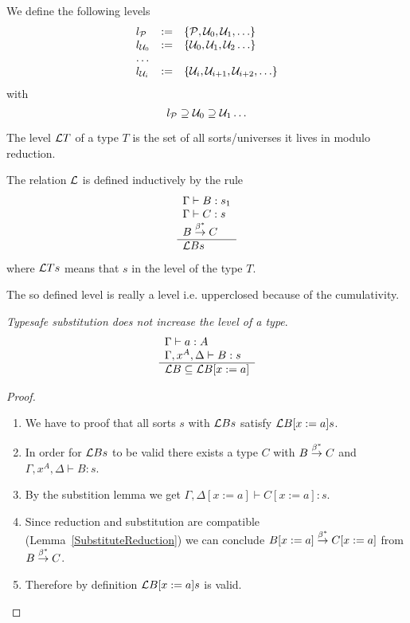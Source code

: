 We define the following levels
$$
\begin{array}{lll}
    l_{\cal P} &:=& \{{\cal P}, {\cal U}_0, {\cal U}_1, \ldots\}
    \\
    l_{{\cal U}_0} &:=& \{ {\cal U}_0, {\cal U}_1, {\cal U}_2 \ldots \}
    \\
    \ldots
    \\
    l_{{\cal U}_i} &:=& \{ {\cal U}_i, {\cal U}_{i+1}, {\cal U}_{i+2}, \ldots \}
\end{array}
$$
with
$$
    l_{\cal P} \supseteq {\cal U}_0 \supseteq {\cal U}_1 \ldots
$$


\begin{definition}
    The level ${\cal L} T$ of a type $T$ is the set of all sorts/universes it
    lives in modulo reduction.

    The relation ${\cal L}$ is defined inductively by the rule
    $$
    \begin{array}{l} 
        \Gamma \vdash B: s_1
        \\
        \Gamma \vdash C: s
        \\
        B \stackrel{\beta^*}{\to} C
     \\ \hline {\cal L} B s\end{array}
    $$
    where ${\cal L} T s$ means that $s$ in the level of the type $T$.
\end{definition}

The so defined level is really a level i.e. upperclosed because of the
cumulativity.


\begin{theorem}
    \emph{Typesafe substitution does not increase the level of a type}.
    $$
    \begin{array}{l} 
        \Gamma \vdash a: A
        \\
        \Gamma, x^A, \Delta \vdash B: s
     \\ \hline {\cal L} B \subseteq {\cal L} B[x:=a]\end{array}
    $$


    \begin{proof}
    \begin{enumerate}
        \item We have to proof that all sorts $s$ with ${\cal L} B s$ satisfy
        ${\cal L} B[x:=a] s$.

        \item In order for ${\cal L} B s$ to be valid there exists a type $C$ with $B
        \stackrel{\beta^*}{\to} C$ and $\Gamma, x^A, \Delta \vdash B: s$.

        \item By the substition lemma we get $\Gamma, \Delta[x:=a] \vdash C[x:=a]: s$.

        \item Since reduction and substitution are compatible
            (Lemma~\ref{SubstituteReduction})
            we can conclude $B[x:=a]
        \stackrel{\beta^*}{\to} C[x:=a]$  from $B \stackrel{\beta^*}{\to} C$.

        \item Therefore by definition ${\cal L} B[x:=a] s$ is valid.
    \end{enumerate}
    \end{proof}
\end{theorem}



